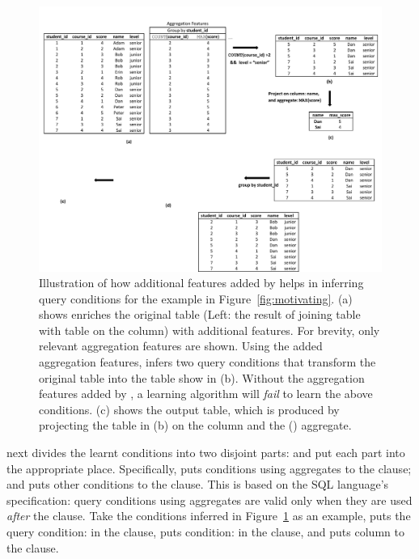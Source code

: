 \begin{figure}[t]
  \centering
  \includegraphics[scale=0.65]{fullexample}
  \vspace*{-5.0ex}\caption {{\label{fig:fullexample}
  Illustration of how additional features added by \ourtool
  helps in inferring query conditions for the example in Figure~\ref{fig:motivating}.
  (a) shows \ourtool
  enriches the original table (Left: the
  result of joining table  with table
   on the  column)
  with additional features. For brevity, only relevant
  aggregation features are shown. Using the added aggregation
  features, \ourtool infers two query conditions that
  transform the original table into the table show in (b).
  Without the aggregation features added by
  \ourtool, a learning algorithm will \textit{fail} to learn the above conditions.
  (c) shows the output table, which is produced by projecting the
   table in (b)
  on the  column and the () aggregate.}}

\end{figure}


\ourtool next divides the learnt conditions into two disjoint parts:
and put each part into the appropriate place.
Specifically, \ourtool puts conditions
using aggregates to the 
clause; and puts other conditions to the  clause.
This is based on the SQL language's specification:
query conditions using aggregates are valid only when they
are used \textit{after} the  clause.
Take the conditions inferred in Figure~\ref{fig:fullexample}
as an example, \ourtool puts the query
condition: 
in the  clause,
puts condition: 
in the  clause, and puts
column  to the  clause.




